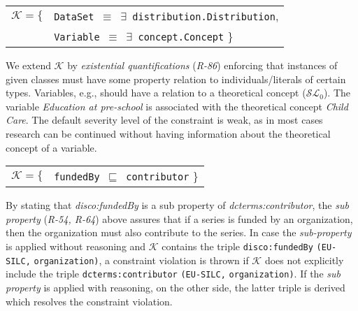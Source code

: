\documentclass{llncs}
\newcommand{\ms}[1]{\texttt{#1}}
\newenvironment{DL}{
  \vspace{0cm}
	\begin{center}
  \begin{tabular}{c l}

}{
  \end{tabular}
	\end{center}
}
\begin{document}
{\begin{center}
\begin{DL} 
$\mathcal{K}=\{$ 
 &\ms{DataSet $\equiv$ $\exists$ distribution.Distribution},\\
&\ms{Variable $\equiv$ $\exists$ concept.Concept}
 \}\\ 
\end{DL}
\end{center}

We extend $\mathcal{K}$ by \emph{existential quantifications} (\emph{R-86}) enforcing that instances of given classes must have some property relation to individuals/literals of certain types.
Variables, e.g., should have a relation to a theoretical concept ($\mathcal{SL}_{0}$).
The variable \emph{Education at pre-school} is associated with the theoretical concept \emph{Child Care}. 
The default severity level of the constraint is weak, as in most cases research can be continued without having information about the theoretical concept of a variable.

\begin{center}
\begin{DL} 
$\mathcal{K}=\{$ 
  &\ms{fundedBy $\sqsubseteq$ contributor}
 \}\\ 
\end{DL}
\end{center}

By stating that \emph{disco:fundedBy} is a sub property of \emph{dcterms:contributor},
the {\em sub property} (\emph{R-54, R-64}) above assures that if a series is funded by an organization, then the organization must also contribute to the series.
In case the \emph{sub-property} is applied without reasoning and $\mathcal{K}$ contains the triple \ms{disco:fundedBy} \ms{(EU-SILC,} \ms{organization)},
a constraint violation is thrown if $\mathcal{K}$ does not explicitly include the triple \ms{dcterms:contributor} \ms{(EU-SILC,} \ms{organization)}.
If the \emph{sub property} is applied with reasoning, on the other side, the latter triple is derived which resolves the constraint violation.

}
\end{document}
